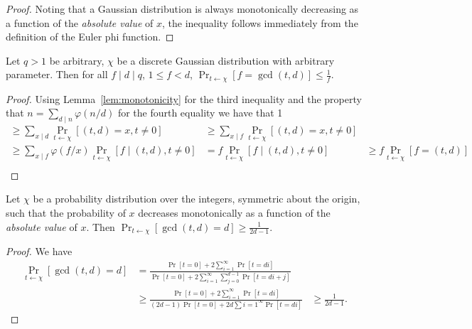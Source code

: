 \begin{proof}
Noting that a Gaussian distribution
is always monotonically decreasing as a function of the \emph{absolute
value} of $x$, the inequality follows immediately from the definition of the Euler phi function.\end{proof}

\begin{corollary}\label{cor:prob_val}
Let $q > 1$ be arbitrary, $\chi$ be a discrete Gaussian distribution
with arbitrary parameter. Then for all $f \mid d \mid q$,  $1 \leq f <
d$, $\Pr_{t \gets \chi}[f = \gcd(t,d)] \leq \tfrac{1}{f}$.
\end{corollary}
\begin{proof}
Using Lemma~\ref{lem:monotonicity} for the third inequality and the
property that $n=\sum_{d \mid n} \varphi(n/d)$ for the fourth equality   we have that 1
\begin{align*}
\geq \sum_{x \mid d}\Pr_{t \gets \chi}[(t,d)=x, t
    \neq 0]&\geq \sum_{x \mid f}\Pr_{t \gets \chi}[(t,d)=x, t \neq
  0]\\
\geq \sum_{x \mid f} \varphi(f/x)\Pr_{t \gets \chi}[f \mid (t,d),  t
  \neq 0]&=f\Pr_{t \gets \chi}[f \mid (t,d), t \neq 0]&\geq f\Pr_{t \gets \chi}[f = (t,d)]\\
\end{align*}
\end{proof}
\begin{lemma}\label{lem:prob_d}
Let $\chi$ be a probability distribution over the integers, symmetric
about the origin, such that the probability of $x$ decreases
monotonically as a function of the \emph{absolute value} of $x$. Then
$\Pr_{t \gets \chi}[\gcd(t,d)=d] \geq \tfrac{1}{2d-1}$.
\end{lemma}
\begin{proof}
We have 
\begin{align*}
\Pr_{t \gets
  \chi}[\gcd(t,d)=d]&=\frac{\Pr[t=0]+2\sum_{i=1}^{\infty}\Pr[t=di]}{\Pr[t=0]+2\sum_{i=1}^{\infty}\sum_{j=0}^{d-1}\Pr[t=di+j]}\\
&\geq
  \frac{\Pr[t=0]+2\sum_{i=1}^{\infty}\Pr[t=di]}{(2d-1)\Pr[t=0]+2d\sum{i=1}^{\infty}\Pr[t=di]}
  & 
\geq \frac{1}{2d-1}.
\end{align*}
\end{proof}

